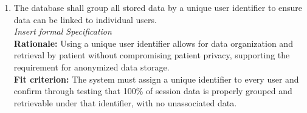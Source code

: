 \documentclass[12pt]{article}
\begin{document}
\begin{enumerate}[{FR-DSC}4. ]
  \item The database shall group all stored data by a unique user identifier to ensure data can be linked to 
  individual users.\\
  \textit{Insert formal Specification}\\
  \textbf{Rationale: }Using a unique user identifier allows for data organization and retrieval by patient without 
  compromising patient privacy, supporting the requirement for anonymized data storage.\\
  \textbf{Fit criterion: }The system must assign a unique identifier to every user and confirm through testing 
  that 100\% of session data is properly grouped and retrievable under that identifier, with no unassociated 
  data.
\end{enumerate}
\end{document}
